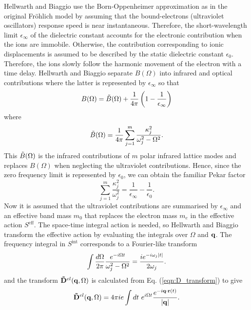 Hellwarth and Biaggio use the Born-Oppenheimer approximation as in the original Fr\"ohlich model by assuming that the bound-electrons (ultraviolet oscillators) response speed is near instantaneous. Therefore, the short-wavelength limit $\epsilon_\infty$ of the dielectric constant accounts for the electronic contribution when the ions are immobile. Otherwise, the contribution corresponding to ionic displacements is assumed to be described by the static dielectric constant $\epsilon_0$. Therefore, the ions slowly follow the harmonic movement of the electron with a time delay. Hellwarth and Biaggio separate $B(\Omega)$ into infrared and optical contributions where the latter is represented by $\epsilon_\infty$ so that
\begin{equation}
    B(\Omega) = \Tilde{B}(\Omega) + \frac{1}{4\pi} \left( 1 - \frac{1}{\epsilon_\infty} \right)
\end{equation}
where
\begin{equation}
\Tilde{B}(\Omega) = \frac{1}{4\pi} \sum_{j=1}^m \frac{\kappa_j^2}{\omega_j^2 - \Omega^2}.  
\end{equation}
This $\Tilde{B}(\Omega)$ is the infrared contributions of $m$ polar infrared lattice modes and replaces $B(\Omega)$ when neglecting the ultraviolet contributions. Hence, since the zero frequency limit is represented by $\epsilon_0$, we can obtain the familiar Pekar factor
\begin{equation}
    \sum_{j=1}^m \frac{\kappa_j^2}{\omega_j^2} = \frac{1}{\epsilon_\infty} - \frac{1}{\epsilon_0}.
\end{equation}
Now it is assumed that the ultraviolet contributions are summarised by $\epsilon_\infty$ and an effective band mass $m_0$ that replaces the electron mass $m_e$ in the effective action $S^{\text{eff}}$. The space-time integral action is needed, so  Hellwarth and Biaggio transform the effective action by evaluating the integrals over $\Omega$ and $\vb{q}$. The frequency integral in $S^{\text{int}}$ corresponds to a Fourier-like transform
\begin{equation}
    \int \frac{d\Omega}{2\pi} \frac{e^{-i\Omega t}}{\omega_j^2 - \Omega^2} = \frac{i e^{-i\omega_j \abs{t}}}{2\omega_j}.
\end{equation}
and the transform $\vb{\Tilde{D}}^{el}(\vb{q}, \Omega)$ is calculated from Eq. (\ref{eqn:D_transform}) to give
\begin{equation}
    \vb{\Tilde{D}}^{el}(\vb{q}, \Omega) = 4\pi i e \int dt\ e^{i\Omega t} \frac{e^{-i\vb{q} \cdot \vb{r}(t)}}{\abs{\vb{q}}}.
\end{equation}
